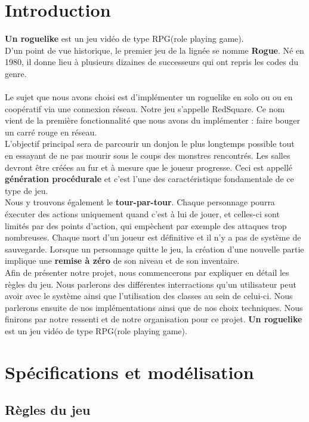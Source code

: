 \documentclass[a4paper, 12pt]{article}
\begin{document}
\newpage
\section*{Introduction} 
\textbf{Un roguelike} est un jeu vidéo de type RPG(role playing game).
\\
D'un point de vue historique, le premier jeu de la lignée se nomme \textbf{Rogue}. Né en 1980, il donne lieu à plusieurs dizaines de successeurs qui ont repris les codes du genre.
\\
\\
Le sujet que nous avons choisi est d’implémenter un roguelike en solo ou ou en coopératif via une connexion réseau. Notre jeu s'appelle RedSquare. Ce nom  vient de la première fonctionnalité que nous avons du implémenter : faire bouger un carré rouge en réseau.
\\ 
L'objectif principal sera de parcourir un donjon le plus longtemps possible tout en essayant de ne pas mourir sous le coups des monstres rencontrés.
Les salles devront être créées au fur et à mesure que le joueur progresse. Ceci est appellé \textbf{génération procédurale} et c'est l'une des caractéristique fondamentale de ce type de jeu.
\\
Nous y trouvons également le \textbf{tour-par-tour}. Chaque personnage pourra éxecuter des actions uniquement quand c'est à lui de jouer, et celles-ci sont limités par des points d'action, qui empèchent par exemple des attaques trop nombreuses.
Chaque mort d'un joueur est définitive et il n'y a pas de système de sauvegarde. Lorsque un personnage quitte le jeu, la création d'une nouvelle partie implique une \textbf{remise à zéro} de son niveau et de son inventaire.
\\
Afin de présenter notre projet, nous commencerons par expliquer en détail les règles du jeu. Nous parlerons des différentes interractions qu'un utilisateur peut avoir avec le système ainsi que l'utilisation des classes au sein de celui-ci. Nous parlerons ensuite de nos implémentations ainsi que de nos choix techniques. Nous finirons par notre ressenti et de notre organisation pour ce projet. \textbf{Un roguelike} est un jeu vidéo de type RPG(role playing game).

\newpage
\tableofcontents
\newpage
\section{Spécifications et modélisation}
 \subsection{Règles du jeu}
\end{document}
